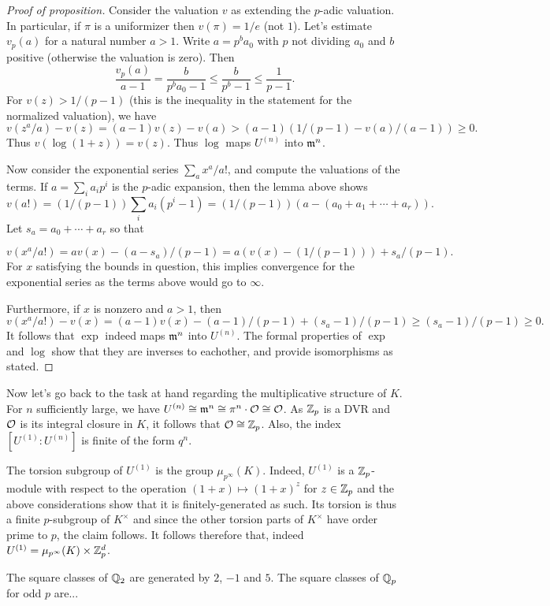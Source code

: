 \begin{proof}[Proof of proposition]
  Consider the valuation $v$ as extending the $p$-adic valuation.
  In particular, if $\pi$ is a uniformizer then $v(\pi) = 1/e$ (not $1$).
  Let's estimate $v_{p}(a)$ for a natural number $a > 1$.
  Write $a = p^{b}a_{0}$ with $p$ not dividing $a_{0}$ and $b$ positive (otherwise the valuation is zero).
  Then
  \[ \frac{v_{p}(a)}{a-1} = \frac{b}{p^{b}a_{0}-1} \le \frac{b}{p^{b}-1} \le \frac{1}{p-1}. \]
  For $v(z) > 1/(p-1)$ (this is the inequality in the statement for the normalized valuation), we have
  \[ v(z^{a}/a) - v(z) = (a-1)v(z) - v(a) > (a-1) (1/(p-1)-v(a)/(a-1)) \geq 0. \]
  Thus $v(\log(1+z)) = v(z)$.
  Thus $\log$ maps $U^{(n)}$ into $\mathfrak{m}^{n}$.

  Now consider the exponential series $\sum_{a} x^{a}/a!$, and compute the valuations of the terms.
  If $a = \sum_{i} a_{i} p^{i}$ is the $p$-adic expansion, then the lemma above shows
  \[ v(a!) = (1/(p-1)) \sum_{i} a_{i}(p^{i}-1) = (1/(p-1)) (a-(a_{0} + a_{1} + \cdots + a_{r})). \]
  Let $s_{a} = a_{0} + \cdots + a_{r}$ so that

  \[ v(x^{a}/a!) = a v(x) - (a-s_{a})/(p-1) = a(v(x)-(1/(p-1))) + s_{a}/(p-1). \]
  For $x$ satisfying the bounds in question, this implies convergence for the exponential series as the terms above would go to $\infty$.

  Furthermore, if $x$ is nonzero and $a > 1$, then
  \[ v(x^{a}/a!) - v(x) = (a-1)v(x) - (a-1)/(p-1) + (s_{a}-1)/(p-1) \geq (s_{a}-1)/(p-1) \geq 0. \]
  It follows that $\exp$ indeed maps $\mathfrak{m}^{n}$ into $U^{(n)}$.
  The formal properties of $\exp$ and $\log$ show that they are inverses to eachother, and provide isomorphisms as stated.
\end{proof}

Now let's go back to the task at hand regarding the multiplicative structure of $K$.
For $n$ sufficiently large, we have $U^{(n)} \cong \mathfrak{m}^{n} \cong \pi^{n} \cdot \mathcal{O} \cong \mathcal{O}$.
As $\mathbb{Z}_{p}$ is a DVR and $\mathcal{O}$ is its integral closure in $K$, it follows that $\mathcal{O} \cong \mathbb{Z}_{p}$.
Also, the index $[U^{(1)}:U^{(n)}]$ is finite of the form $q^{n}$.

The torsion subgroup of $U^{(1)}$ is the group $\mu_{p^{\infty}}(K)$.
Indeed, $U^{(1)}$ is a $\mathbb{Z}_{p}$-module with respect to the operation $(1+x) \mapsto (1+x)^{z}$ for $z \in \mathbb{Z}_{p}$ and the above considerations show that it is finitely-generated as such.
Its torsion is thus a finite $p$-subgroup of $K^{\times}$ and since the other torsion parts of $K^{\times}$ have order prime to $p$, the claim follows.
It follows therefore that, indeed $U^{(1)} = \mu_{p^{\infty}}(K) \times \mathbb{Z}_{p}^{d}$.

\begin{example}
  The square classes of $\mathbb{Q}_{2}$ are generated by $2$, $-1$ and $5$.
  The square classes of $\mathbb{Q}_{p}$ for odd $p$ are...
\end{example}

